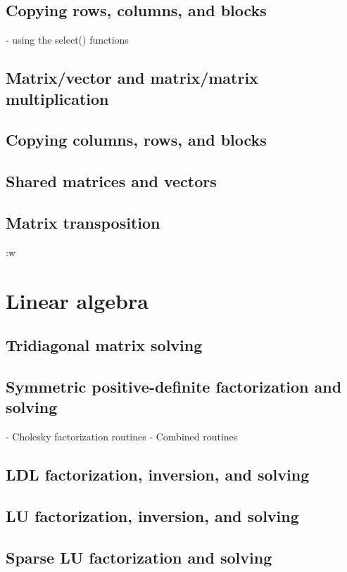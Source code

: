 \documentclass[11pt, letterpaper]{article}
\begin{document}
\subsection{Copying rows, columns, and blocks}
- using the select() functions

\subsection{Matrix/vector and matrix/matrix multiplication}

\subsection{Copying columns, rows, and blocks}

\subsection{Shared matrices and vectors}

\subsection{Matrix transposition}:w


\section{Linear algebra}

\subsection{Tridiagonal matrix solving}

\subsection{Symmetric positive-definite factorization and solving}
- Cholesky factorization routines
- Combined routines

\subsection{LDL factorization, inversion, and solving}

\subsection{LU factorization, inversion, and solving}

\subsection{Sparse LU factorization and solving}
\end{document}
